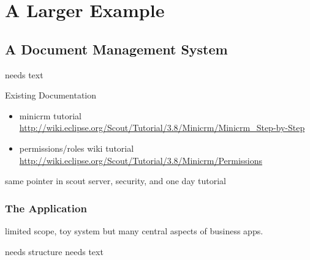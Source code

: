 \documentclass[a4paper,10pt,twoside]{book}
\begin{document}
\chapter{A Larger Example}

\section{A Document Management System}
needs text

\noindent Existing Documentation
\begin{itemize}
  \item minicrm tutorial \url{http://wiki.eclipse.org/Scout/Tutorial/3.8/Minicrm/Minicrm_Step-by-Step}
  \item permissions/roles wiki tutorial \url{http://wiki.eclipse.org/Scout/Tutorial/3.8/Minicrm/Permissions}
\end{itemize}

same pointer in scout server, security, and one day tutorial

\subsection{The Application}
limited scope, toy system but many central aspects of business apps. 

needs structure 
needs text

\ifx\wholebook\relax\else
   
   
\end{document}
